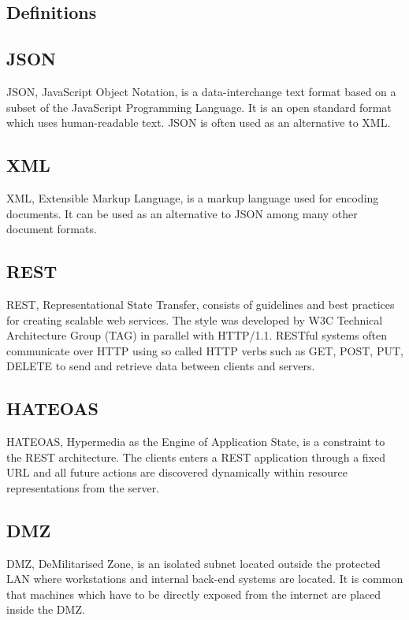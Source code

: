 \documentclass{cslthse-msc}
\begin{document}
\begin{appendices}
\chapter{Definitions}
\section{JSON}
JSON, JavaScript Object Notation, is a data-interchange text format based on a subset of the JavaScript Programming Language. It is an open standard format which uses human-readable text. JSON is often used as an alternative to XML.

\section{XML}
XML, Extensible Markup Language, is a markup language used for encoding documents. It can be used as an alternative to JSON among many other document formats.

\section{REST}
REST, Representational State Transfer, consists of guidelines and best practices for creating scalable web services. The style was developed by W3C Technical Architecture Group (TAG) in parallel with HTTP/1.1. RESTful systems often communicate over HTTP using so called HTTP verbs such as GET, POST, PUT, DELETE to send and retrieve data between clients and servers.

\section{HATEOAS}
HATEOAS, Hypermedia as the Engine of Application State, is a constraint to the REST architecture. The clients enters a REST application through a fixed URL and all future actions are discovered dynamically within resource representations from the server.

\section{DMZ}
DMZ, DeMilitarised  Zone, is an isolated subnet located outside the protected LAN where workstations and internal back-end systems are located. It is common that machines which have to be directly exposed from the internet are placed inside the DMZ.

\end{appendices}

\end{document}
